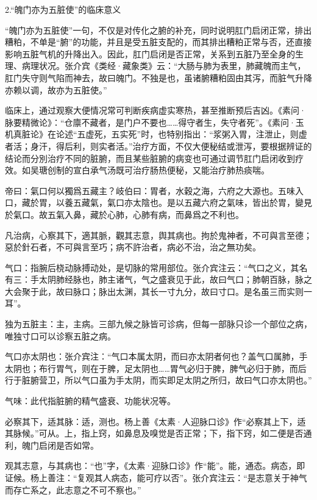 \documentclass[12pt]{ctexbook}
\begin{document}
2.“魄门亦为五脏使”的临床意义

“魄门亦为五脏使”一句，不仅是对传化之腑的补充，同时说明肛门启闭正常，排出糟粕，不单是“腑”的功能，并且是受五脏支配的，而其排出糟粕正常与否，还直接影响五脏气机的升降出入。因此，肛门启闭是否正常，关系到五脏乃至全身的生理、病理状况。张介宾《类经·藏象类》云：“大肠与肺为表里，肺藏魄而主气，肛门失守则气陷而神去，故曰魄门。不独是也，虽诸腑糟粕固由其泻，而脏气升降亦赖以调，故亦为五脏使。”

临床上，通过观察大便情况常可判断疾病虚实寒热，甚至推断预后吉凶。《素问·脉要精微论》：“仓廪不藏者，是门户不要也……得守者生，失守者死”。《素问·玉机真脏论》在论述“五虚死，五实死”时，也特别指出：“浆粥入胃，注泄止，则虚者活；身汗，得后利，则实者活。”治疗方面，不仅大便秘结或泄泻，要根据辨证的结论而分別治疗不同的脏腑，而且某些脏腑的病变也可通过调节肛门启闭收到疗效。如吴瑭创制的宣白承气汤既可治疗肠热便秘，又能治疗肺热痰喘。


\begin{yuanwen}
帝曰：氣口何以獨爲五藏主？岐伯曰：胃者，水穀之海，六府之大源也。五味入口，藏於胃，以養五藏氣，氣口亦太陰也。是以五藏六府之氣味，皆出於胃，變見於氣口。故五氣入鼻，藏於心肺，心肺有病，而鼻爲之不利也。

凡治病，心察其下，適其脈，觀其志意，舆其病也。拘於鬼神者，不可與言至德；惡於針石者，不可與言至巧；病不許治者，病必不治，治之無功矣。
\end{yuanwen}


\begin{jiaozhu}
  \item 气口：指腕后桡动脉搏动处，是切脉的常用部位。张介宾注云：“气口之义，其名有三：手太阴肺经脉也，肺主诸气，气之盛衰见于此，故曰气口；肺朝百脉，脉之大会聚于此，故曰脉口；脉出太渊，其长一寸九分，故曰寸口。是名虽三而实则一耳”。
  \item 独为五脏主：主，主病。三部九候之脉皆可诊病，但每一部脉只诊一个部位之病，唯独寸口可以诊察五脏之病。
  \item 气口亦太阴也：张介宾注：“气口本属太阴，而曰亦太阴者何也？盖气口属肺，手太阴也；布行胃气，则在于脾，足太阴也……胃气必归于脾，脾气必归于肺，而后行于脏腑营卫，所以气口虽为手太阴，而实即足太阴之所归，故曰气口亦太阴也。”
  \item 气味：此代指脏腑的精气盛衰、功能状况等。
  \item 必察其下，适其脉：适，测也。杨上善《太素·人迎脉口诊》作“必察其上下，适其脉候。”可从。上，指上窍，如鼻息及嗅觉是否正常；下，指下窍，如二便是否通利，魄门启闭是否如常。
  \item 观其志意，与其病也：“也”字，《太素·迎脉口诊》作“能”。能，通态。病态，即证候。杨上善注：“复观其人病态，能可疗以否”。张介宾注云：“是志意关于神气而存亡系之，此志意之不可不察也。”
\end{jiaozhu}
\end{document}
